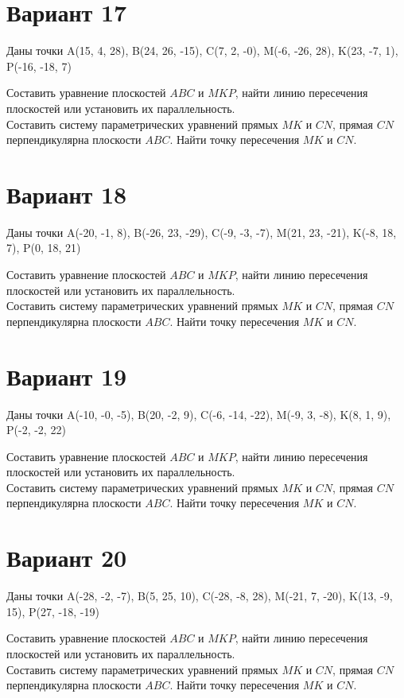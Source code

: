 \documentclass[11pt]{article}
\begin{document}
\section*{Вариант 17}
Даны точки A(15, 4, 28), B(24, 26, -15), C(7, 2, -0), M(-6, -26, 28), K(23, -7, 1), P(-16, -18, 7)

Составить уравнение плоскостей $ABC$ и $MKP$, найти линию пересечения плоскостей или установить их параллельность.\\
Составить систему параметрических уравнений прямых $MK$ и $CN$, прямая $CN$ перпендикулярна плоскости $ABC$. Найти точку пересечения $MK$ и $CN$.

\section*{Вариант 18}
Даны точки A(-20, -1, 8), B(-26, 23, -29), C(-9, -3, -7), M(21, 23, -21), K(-8, 18, 7), P(0, 18, 21)

Составить уравнение плоскостей $ABC$ и $MKP$, найти линию пересечения плоскостей или установить их параллельность.\\
Составить систему параметрических уравнений прямых $MK$ и $CN$, прямая $CN$ перпендикулярна плоскости $ABC$. Найти точку пересечения $MK$ и $CN$.

\section*{Вариант 19}
Даны точки A(-10, -0, -5), B(20, -2, 9), C(-6, -14, -22), M(-9, 3, -8), K(8, 1, 9), P(-2, -2, 22)

Составить уравнение плоскостей $ABC$ и $MKP$, найти линию пересечения плоскостей или установить их параллельность.\\
Составить систему параметрических уравнений прямых $MK$ и $CN$, прямая $CN$ перпендикулярна плоскости $ABC$. Найти точку пересечения $MK$ и $CN$.

\section*{Вариант 20}
Даны точки A(-28, -2, -7), B(5, 25, 10), C(-28, -8, 28), M(-21, 7, -20), K(13, -9, 15), P(27, -18, -19)

Составить уравнение плоскостей $ABC$ и $MKP$, найти линию пересечения плоскостей или установить их параллельность.\\
Составить систему параметрических уравнений прямых $MK$ и $CN$, прямая $CN$ перпендикулярна плоскости $ABC$. Найти точку пересечения $MK$ и $CN$.
\end{document}
